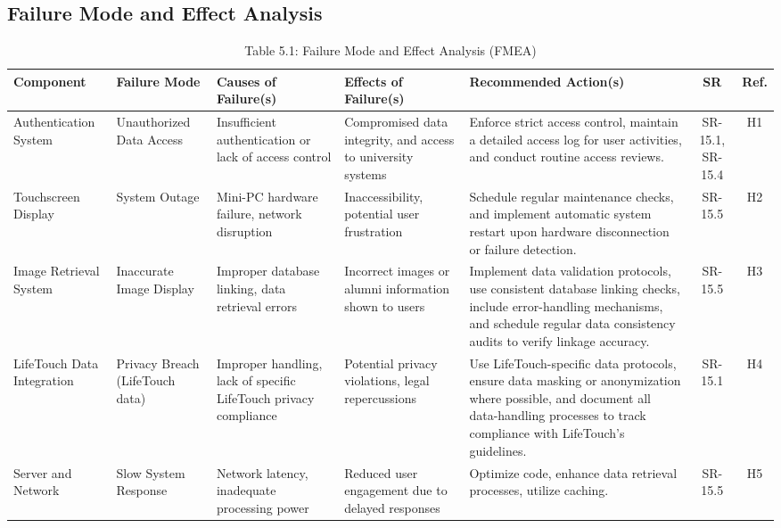 \documentclass{article}
\begin{document}
\begin{landscape}
\section{Failure Mode and Effect Analysis}
\begin{table}[H]
\centering
\caption{Table 5.1: Failure Mode and Effect Analysis (FMEA)}
\renewcommand{\arraystretch}{1}
\begin{adjustbox}{max width=\linewidth}
\begin{tabular}{|p{4cm}|p{3.8cm}|p{4cm}|p{4cm}|p{6cm}|c|c|}
\hline
\textbf{Component} & \textbf{Failure Mode} & \textbf{Causes of Failure(s)} & \textbf{Effects of Failure(s)} & \textbf{Recommended Action(s)} & \textbf{SR} & \textbf{Ref.} \\
\hline
Authentication System & Unauthorized Data Access & Insufficient authentication or lack of access control & Compromised data integrity, and access to university systems & Enforce strict access control, maintain a detailed access log for user activities, and conduct routine access reviews. & SR-15.1, SR-15.4 & H1 \\
\hline
Touchscreen Display & System Outage & Mini-PC hardware failure, network disruption & Inaccessibility, potential user frustration & Schedule regular maintenance checks, and implement automatic system restart upon hardware disconnection or failure detection. & SR-15.5 & H2 \\
\hline
Image Retrieval System & Inaccurate Image Display & Improper database linking, data retrieval errors & Incorrect images or alumni information shown to users & Implement data validation protocols, use consistent database linking checks, include error-handling mechanisms, and schedule regular data consistency audits to verify linkage accuracy. & SR-15.5 & H3 \\
\hline
LifeTouch Data Integration & Privacy Breach (LifeTouch data) & Improper handling, lack of specific LifeTouch privacy compliance & Potential privacy violations, legal repercussions & Use LifeTouch-specific data protocols, ensure data masking or anonymization where possible, and document all data-handling processes to track compliance with LifeTouch’s guidelines. & SR-15.1 & H4 \\
\hline
Server and Network & Slow System Response & Network latency, inadequate processing power & Reduced user engagement due to delayed responses & Optimize code, enhance data retrieval processes, utilize caching. & SR-15.5 & H5 \\

\end{tabular}
\end{adjustbox}
\end{table}
\end{landscape}
\end{document}
